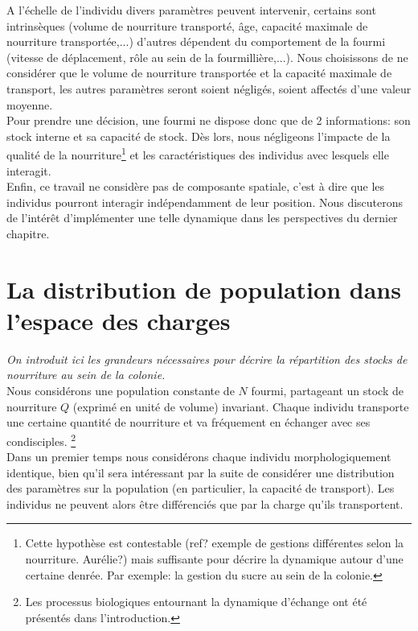 A l'échelle de l'individu divers paramètres peuvent intervenir, certains sont intrinsèques (volume de nourriture transporté, âge, capacité maximale de nourriture transportée,...) d'autres dépendent du comportement de la fourmi (vitesse de déplacement, rôle au sein de la fourmillière,...). Nous choisissons de ne considérer que le volume de nourriture transportée et la capacité maximale de transport, les autres paramètres seront soient négligés, soient affectés d'une valeur moyenne.\\

Pour prendre une décision, une fourmi ne dispose donc que de 2 informations: son stock interne et sa capacité de stock. Dès lors, nous négligeons l'impacte de la qualité de la nourriture\footnote{Cette hypothèse est contestable (ref? exemple de gestions différentes selon la nourriture. Aurélie?) mais suffisante pour décrire la dynamique autour d'une certaine denrée. Par exemple: la gestion du sucre au sein de la colonie.} et les caractéristiques des individus avec lesquels elle interagit. \\

Enfin, ce travail ne considère pas de composante spatiale, c'est à dire que les individus pourront interagir indépendamment de leur position. Nous discuterons de l'intérêt d'implémenter une telle dynamique dans les perspectives du dernier chapitre.


\section{La distribution de population dans l'espace des charges}
\textit{On introduit ici les grandeurs nécessaires pour décrire la répartition des stocks de nourriture au sein de la colonie.}\\

Nous considérons une population constante de $N$ fourmi, partageant un stock de nourriture $Q$ (exprimé en unité de volume) invariant. Chaque individu transporte une certaine quantité de nourriture  et va fréquement en échanger avec ses condisciples. \footnote{Les processus biologiques entournant la dynamique d'échange ont été présentés dans l'introduction.} \\

Dans un premier temps nous considérons chaque individu morphologiquement identique, bien qu'il sera intéressant par la suite de considérer une distribution des paramètres sur la population (en particulier, la capacité de transport). Les individus ne peuvent alors être différenciés que par la charge qu'ils transportent.\\

